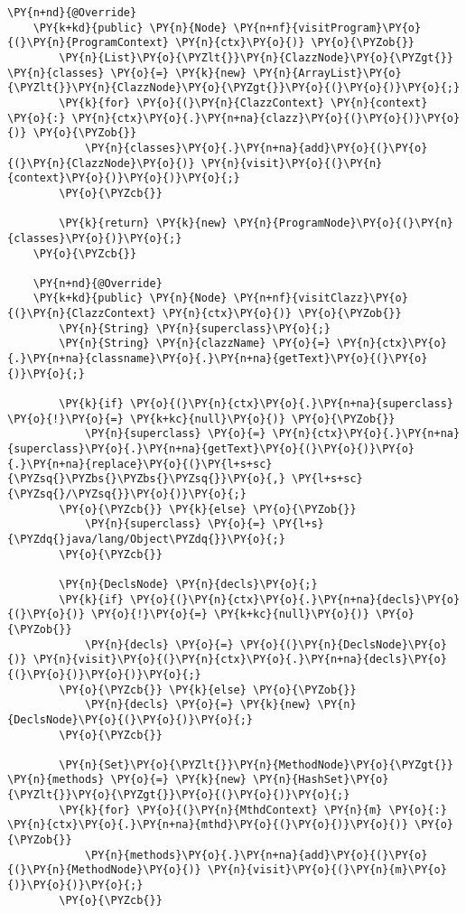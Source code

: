 \begin{Verbatim}[commandchars=\\\{\}]
    \PY{n+nd}{@Override}
    \PY{k+kd}{public} \PY{n}{Node} \PY{n+nf}{visitProgram}\PY{o}{(}\PY{n}{ProgramContext} \PY{n}{ctx}\PY{o}{)} \PY{o}{\PYZob{}}
        \PY{n}{List}\PY{o}{\PYZlt{}}\PY{n}{ClazzNode}\PY{o}{\PYZgt{}} \PY{n}{classes} \PY{o}{=} \PY{k}{new} \PY{n}{ArrayList}\PY{o}{\PYZlt{}}\PY{n}{ClazzNode}\PY{o}{\PYZgt{}}\PY{o}{(}\PY{o}{)}\PY{o}{;}
        \PY{k}{for} \PY{o}{(}\PY{n}{ClazzContext} \PY{n}{context} \PY{o}{:} \PY{n}{ctx}\PY{o}{.}\PY{n+na}{clazz}\PY{o}{(}\PY{o}{)}\PY{o}{)} \PY{o}{\PYZob{}}
            \PY{n}{classes}\PY{o}{.}\PY{n+na}{add}\PY{o}{(}\PY{o}{(}\PY{n}{ClazzNode}\PY{o}{)} \PY{n}{visit}\PY{o}{(}\PY{n}{context}\PY{o}{)}\PY{o}{)}\PY{o}{;}
        \PY{o}{\PYZcb{}}

        \PY{k}{return} \PY{k}{new} \PY{n}{ProgramNode}\PY{o}{(}\PY{n}{classes}\PY{o}{)}\PY{o}{;}
    \PY{o}{\PYZcb{}}

    \PY{n+nd}{@Override}
    \PY{k+kd}{public} \PY{n}{Node} \PY{n+nf}{visitClazz}\PY{o}{(}\PY{n}{ClazzContext} \PY{n}{ctx}\PY{o}{)} \PY{o}{\PYZob{}}
        \PY{n}{String} \PY{n}{superclass}\PY{o}{;}
        \PY{n}{String} \PY{n}{clazzName} \PY{o}{=} \PY{n}{ctx}\PY{o}{.}\PY{n+na}{classname}\PY{o}{.}\PY{n+na}{getText}\PY{o}{(}\PY{o}{)}\PY{o}{;}

        \PY{k}{if} \PY{o}{(}\PY{n}{ctx}\PY{o}{.}\PY{n+na}{superclass} \PY{o}{!}\PY{o}{=} \PY{k+kc}{null}\PY{o}{)} \PY{o}{\PYZob{}}
            \PY{n}{superclass} \PY{o}{=} \PY{n}{ctx}\PY{o}{.}\PY{n+na}{superclass}\PY{o}{.}\PY{n+na}{getText}\PY{o}{(}\PY{o}{)}\PY{o}{.}\PY{n+na}{replace}\PY{o}{(}\PY{l+s+sc}{\PYZsq{}\PYZbs{}\PYZbs{}\PYZsq{}}\PY{o}{,} \PY{l+s+sc}{\PYZsq{}/\PYZsq{}}\PY{o}{)}\PY{o}{;}
        \PY{o}{\PYZcb{}} \PY{k}{else} \PY{o}{\PYZob{}}
            \PY{n}{superclass} \PY{o}{=} \PY{l+s}{\PYZdq{}java/lang/Object\PYZdq{}}\PY{o}{;}
        \PY{o}{\PYZcb{}}

        \PY{n}{DeclsNode} \PY{n}{decls}\PY{o}{;}
        \PY{k}{if} \PY{o}{(}\PY{n}{ctx}\PY{o}{.}\PY{n+na}{decls}\PY{o}{(}\PY{o}{)} \PY{o}{!}\PY{o}{=} \PY{k+kc}{null}\PY{o}{)} \PY{o}{\PYZob{}}
            \PY{n}{decls} \PY{o}{=} \PY{o}{(}\PY{n}{DeclsNode}\PY{o}{)} \PY{n}{visit}\PY{o}{(}\PY{n}{ctx}\PY{o}{.}\PY{n+na}{decls}\PY{o}{(}\PY{o}{)}\PY{o}{)}\PY{o}{;}
        \PY{o}{\PYZcb{}} \PY{k}{else} \PY{o}{\PYZob{}}
            \PY{n}{decls} \PY{o}{=} \PY{k}{new} \PY{n}{DeclsNode}\PY{o}{(}\PY{o}{)}\PY{o}{;}
        \PY{o}{\PYZcb{}}
        
        \PY{n}{Set}\PY{o}{\PYZlt{}}\PY{n}{MethodNode}\PY{o}{\PYZgt{}} \PY{n}{methods} \PY{o}{=} \PY{k}{new} \PY{n}{HashSet}\PY{o}{\PYZlt{}}\PY{o}{\PYZgt{}}\PY{o}{(}\PY{o}{)}\PY{o}{;}
        \PY{k}{for} \PY{o}{(}\PY{n}{MthdContext} \PY{n}{m} \PY{o}{:} \PY{n}{ctx}\PY{o}{.}\PY{n+na}{mthd}\PY{o}{(}\PY{o}{)}\PY{o}{)} \PY{o}{\PYZob{}}
            \PY{n}{methods}\PY{o}{.}\PY{n+na}{add}\PY{o}{(}\PY{o}{(}\PY{n}{MethodNode}\PY{o}{)} \PY{n}{visit}\PY{o}{(}\PY{n}{m}\PY{o}{)}\PY{o}{)}\PY{o}{;}
        \PY{o}{\PYZcb{}}
        

\end{Verbatim}
